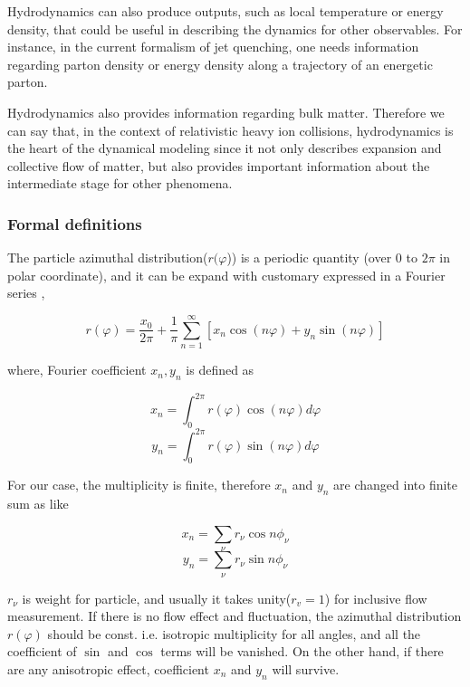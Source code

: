 	Hydrodynamics can also produce outputs, such as local temperature or energy density, that could be useful in describing the dynamics for other observables. For instance, in the current formalism of jet quenching, one needs information regarding parton density or energy density along a trajectory of an energetic parton.
	
  Hydrodynamics also provides information regarding bulk matter. Therefore we can say that, in the context of relativistic heavy ion collisions, hydrodynamics is the heart of the dynamical modeling since it not only describes expansion and collective flow of matter, but also provides important information about the intermediate stage for other phenomena.
	
	\subsubsection{Formal definitions}
	The particle azimuthal distribution($r(\varphi$)) is a periodic quantity (over 0 to $2\pi$ in polar coordinate), and it can be expand with customary expressed in a Fourier series \cite{Voloshin:2008dg, Voloshin1996},
	
\begin{equation}
	r(\varphi)=\frac{x_0}{2\pi} + \frac{1}{\pi}\sum_{n=1}^{\infty}[x_n \cos(n\varphi) + y_n \sin(n\varphi)]
	\label{eq:flow}
\end{equation}
\smallskip
	
	
	where, Fourier coefficient $x_n, y_n$ is defined as
	
\begin{equation}
	x_n = \int_{0}^{2\pi} r(\varphi)\cos(n\varphi)d\varphi	
\end{equation}
\begin{equation}
	y_n = \int_{0}^{2\pi} r(\varphi)\sin(n\varphi)d\varphi	
\end{equation}
\smallskip

For our case, the multiplicity is finite, therefore $x_n$ and $y_n$ are changed into finite sum as like

\begin{equation}
x_n=\sum_{\nu}r_{\nu}\cos{n\phi_{\nu}}
\end{equation}
\begin{equation}
y_n=\sum_{\nu}r_{\nu}\sin{n\phi_{\nu}}
\label{eq:yndef}
\end{equation}
\smallskip

 $r_\nu$ is weight for particle, and usually it takes unity($r_v = 1$) for inclusive flow measurement. If there is no flow effect and fluctuation, the azimuthal distribution $r(\varphi)$ should be const. i.e. isotropic multiplicity for all angles, and all the coefficient of $\sin$ and $\cos$ terms will be vanished. On the other hand, if there are any anisotropic effect, coefficient $x_n$ and $y_n$ will survive. 
 
